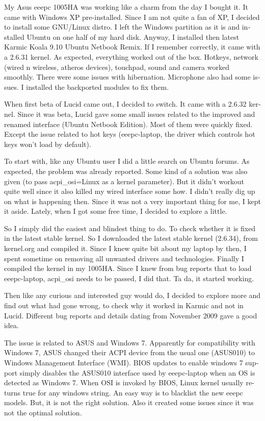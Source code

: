 \begin{english}
\vskip 2pt
My Asus eeepc 1005HA was working like a charm from the day I bought it. 
It came with Windows XP pre-installed. Since I am not quite a fan of XP, I 
decided to install some GNU/Linux distro. I left the Windows partition as 
it is and installed Ubuntu on one half of my hard disk. Anyway, I installed 
then latest Karmic Koala 9.10 Ubuntu Netbook Remix. If I remember correctly, 
it came with a 2.6.31 kernel. As expected, everything worked out of the box.
 Hotkeys, network (wired n wireless, atheros devices), touchpad, sound and camera 
worked smoothly. There were some issues with hibernation. Microphone also had some 
issues. I installed the backported modules to fix them.

When first beta of Lucid came out, I decided to switch. It came with a 2.6.32 kernel. 
Since it was beta, Lucid gave some small issues related to the improved and renamed 
interface (Ubuntu Netbook Edition). Most of them were quickly fixed. Except the issue 
related to hot keys (eeepc-laptop, the driver which controls hot keys won't load by default).

To start with, like any Ubuntu user I did a little search on Ubuntu forums. As expected, 
the problem was already reported. Some kind of a solution was also given 
(to pass acpi\_osi=Linux as a kernel parameter). But it didn't workout quite well since 
it also killed my wired interface some how. I didn’t really dig up on what is happening 
then. Since it was not a very important thing for me, I kept it aside. Lately, when I 
got some free time, I decided to explore a little.

So I simply did the easiest and blindest thing to do. To check whether it is fixed in the 
latest stable kernel. So I downloaded the latest stable kernel (2.6.34), from kernel.org 
and compiled it. Since I knew quite bit about my laptop by then, I spent sometime on 
removing all unwanted drivers and technologies. Finally I compiled the kernel in my 1005HA. 
Since I knew from bug reports that to load eeepc-laptop, acpi\_osi needs to be passed, 
I did that. Ta da, it started working.

Then like any curious and interested guy would do, I decided to explore more and find out 
what had gone wrong, to check why it worked in Karmic and not in Lucid. 
Different bug reports and details dating from November 2009 gave a good idea.

The issue is related to ASUS and Windows 7. Apparently for compatibility with Windows 7, 
ASUS changed their ACPI device from the usual one (ASUS010) to Windows Management Interface (WMI). 
BIOS updates to enable windows 7 support simply disables the ASUS010 interface used by eeepc-laptop 
when an OS is detected as Windows 7. When OSI is invoked by BIOS, Linux kernel usually returns true 
for any windows string. An easy way is to blacklist the new eeepc models. But, it is not the right solution. 
Also it created some issues since it was not the optimal solution.


\end{english}
